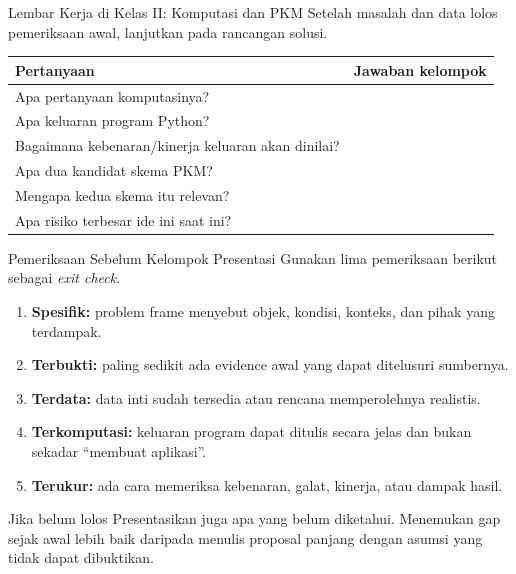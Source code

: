 \documentclass[aspectratio=169,11pt]{beamer}
\begin{document}
\begin{frame}{Lembar Kerja di Kelas II: Komputasi dan PKM}
\footnotesize
Setelah masalah dan data lolos pemeriksaan awal, lanjutkan pada rancangan solusi.

\begin{center}
\renewcommand{\arraystretch}{1.18}
\begin{tabular}{p{5.2cm} p{7.7cm}}
\toprule
\textbf{Pertanyaan} & \textbf{Jawaban kelompok} \\
\midrule
Apa pertanyaan komputasinya? & \\
Apa keluaran program Python? & \\
Bagaimana kebenaran/kinerja keluaran akan dinilai? & \\
Apa dua kandidat skema PKM? & \\
Mengapa kedua skema itu relevan? & \\
Apa risiko terbesar ide ini saat ini? & \\
\bottomrule
\end{tabular}
\end{center}
\end{frame}

\begin{frame}{Pemeriksaan Sebelum Kelompok Presentasi}
\small
Gunakan lima pemeriksaan berikut sebagai \textit{exit check}.

\begin{enumerate}
  \item \textbf{Spesifik:} problem frame menyebut objek, kondisi, konteks, dan pihak yang terdampak.
  \item \textbf{Terbukti:} paling sedikit ada evidence awal yang dapat ditelusuri sumbernya.
  \item \textbf{Terdata:} data inti sudah tersedia atau rencana memperolehnya realistis.
  \item \textbf{Terkomputasi:} keluaran program dapat ditulis secara jelas dan bukan sekadar ``membuat aplikasi''.
  \item \textbf{Terukur:} ada cara memeriksa kebenaran, galat, kinerja, atau dampak hasil.
\end{enumerate}

\begin{alertblock}{Jika belum lolos}
\footnotesize
Presentasikan juga apa yang belum diketahui. Menemukan gap sejak awal lebih baik daripada menulis proposal panjang dengan asumsi yang tidak dapat dibuktikan.
\end{alertblock}
\end{frame}
\end{document}
